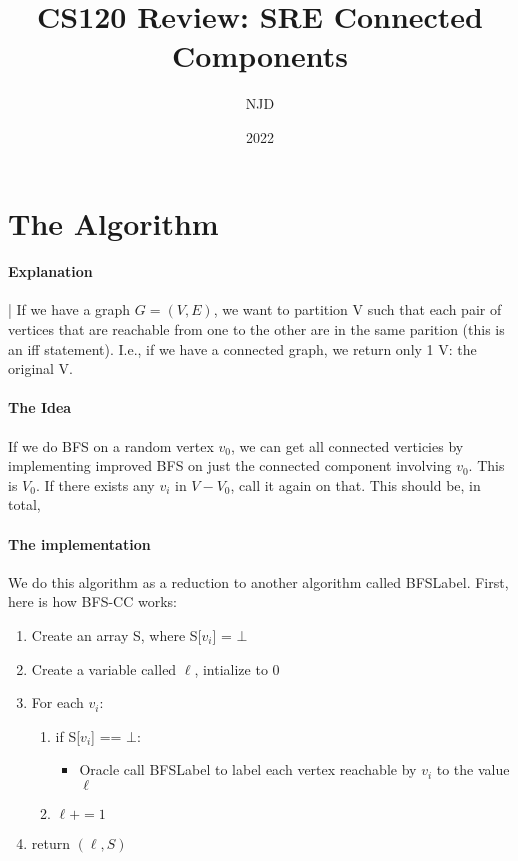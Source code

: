 \documentclass{article}
\title{CS120 Review: SRE Connected Components}
\author{NJD}
\date{2022}
\begin{document}
\maketitle

\section*{The Algorithm}
\paragraph*{Explanation} |
If we have a graph $G=(V,E)$, we want to partition V such that each pair of vertices that are reachable from one to the other
are in the same parition (this is an iff statement). I.e., if we have a connected graph, we return only 1 V: the original V.

\paragraph*{The Idea}
If we do BFS on a random vertex $v_{0}$, we can get all connected verticies by implementing improved BFS on just the connected component
involving $v_{0}$. This is $V_{0}$. If there exists any $v_{i}$ in $V - V_{0}$, call it again on that. This should be, in total, 

\paragraph*{The implementation}
We do this algorithm as a reduction to another algorithm called BFSLabel. First, here is how BFS-CC works:

\begin{enumerate}
  \item Create an array S, where S[$v_{i}$] = $\bot$
  \item Create a variable called $\ell$, intialize to 0
  \item For each $v_{i}$:
  \begin{enumerate}
    \item if S[$v_{i}$] == $\bot$:
    \begin{itemize}
      \item Oracle call BFSLabel to label each vertex reachable by $v_{i}$ to the value $\ell$
    \end{itemize}
    \item $\ell += 1$
  \end{enumerate}
  \item return $(\ell, S)$
\end{enumerate}
\end{document}
